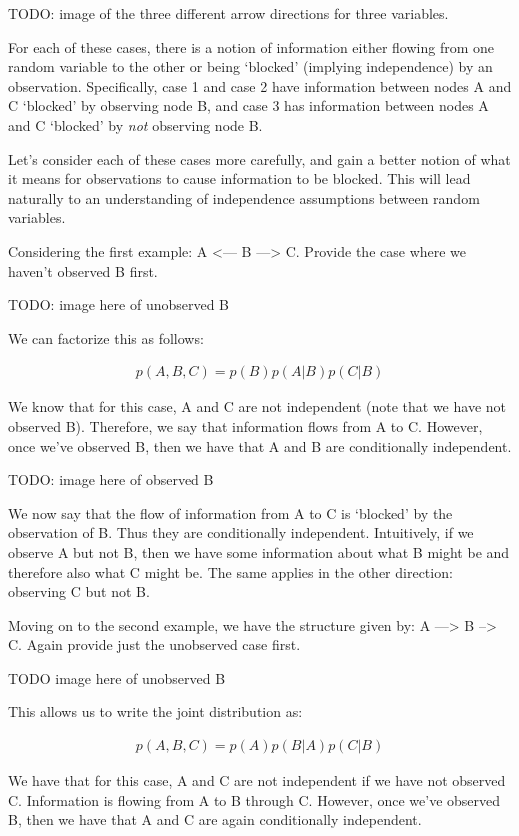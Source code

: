 TODO: image of the three different arrow directions for three variables.

For each of these cases, there is a notion of information either flowing from one random variable to the other or being `blocked' (implying independence) by an observation. Specifically, case 1 and case 2 have information between nodes A and C `blocked' by observing node B, and case 3 has information between nodes A and C `blocked' by \textit{not} observing node B.

Let's consider each of these cases more carefully, and gain a better notion of what it means for observations to cause information to be blocked. This will lead naturally to an understanding of independence assumptions between random variables.

Considering the first example: A <--- B ---> C. Provide the case where we haven't observed B first.

TODO: image here of unobserved B

We can factorize this as follows:

\begin{align*}
	p(A, B, C) = p(B) p(A | B) p(C | B)
\end{align*}

We know that for this case, A and C are not independent (note that we have not observed B). Therefore, we say that information flows from A to C. However, once we've observed B, then we have that A and B are conditionally independent.

TODO: image here of observed B

We now say that the flow of information from A to C is `blocked' by the observation of B. Thus they are conditionally independent. Intuitively, if we observe A but not B, then we have some information about what B might be and therefore also what C might be. The same applies in the other direction: observing C but not B.

Moving on to the second example, we have the structure given by: A ---> B --> C. Again provide just the unobserved case first.

TODO image here of unobserved B

This allows us to write the joint distribution as:

\begin{align*}
	p(A, B, C) = p(A) p(B | A) p(C | B)
\end{align*}

We have that for this case, A and C are not independent if we have not observed C. Information is flowing from A to B through C. However, once we've observed B, then we have that A and C are again conditionally independent.


